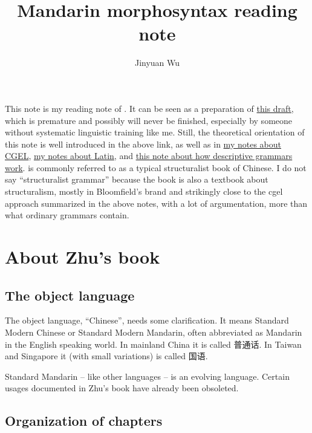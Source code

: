 \documentclass[UTF8, a4paper, oneside, scheme=plain]{ctexart}
\title{Mandarin morphosyntax reading note}
\author{Jinyuan Wu}
\newcommand{\cgel}{\href{../English/cambridge.pdf}{my notes about CGEL}}
\newcommand{\latin}{\href{../Latin/latin-notes.pdf}{my notes about Latin}}
\newcommand{\method}{\href{../methodology/glossing.pdf}{this note about how descriptive grammars work}}
\newcommand{\draft}{\href{./main.pdf}{this draft}}
\begin{document}
\maketitle

This note is my reading note of \citet{zhudexigrammar}.
It can be seen as a preparation of \draft,
which is premature and possibly will never be finished,
especially by someone without systematic linguistic training like me.
Still, the theoretical orientation of this note is well introduced in the above link,
as well as in \cgel, \latin, and \method.
\citet{zhudexigrammar} is commonly referred to as a typical structuralist book of Chinese.
I do not say ``structuralist grammar'' because the book is also a textbook about structuralism,
mostly in Bloomfield's brand
and strikingly close to the \ac{cgel} \citep{cgel} approach summarized in the above notes,
with a lot of argumentation, more than what ordinary grammars contain.

\section{About Zhu's book}

\subsection{The object language}

The object language, ``Chinese'', needs some clarification.
It means Standard Modern Chinese or Standard Modern Mandarin,
often abbreviated as Mandarin in the English speaking world.
In mainland China it is called 普通话.
In Taiwan and Singapore it (with small variations) is called 国语.

Standard Mandarin -- like other languages -- is an evolving language.
Certain usages documented in Zhu's book have already been obsoleted.

\subsection{Organization of chapters}\label{sec:organization-chapter}
\end{document}
